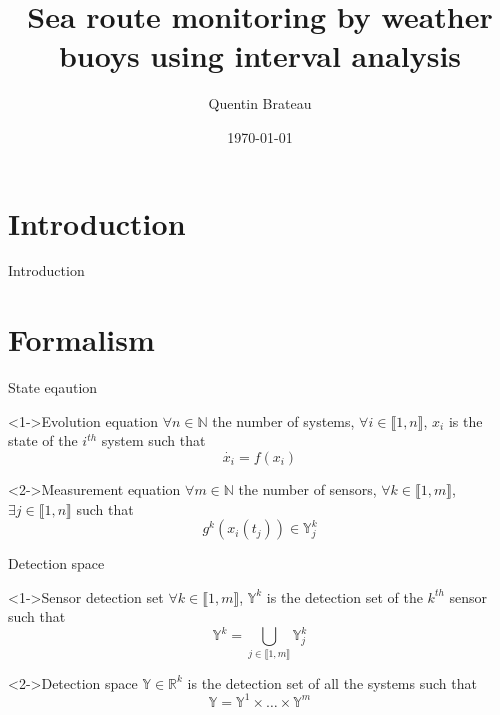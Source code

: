\documentclass{beamer}
\title{Sea route monitoring by weather buoys using interval analysis}
\date{\today}
\author{Quentin Brateau}
\institute{ENSTA Bretagne}
\begin{document}
    \maketitle

    \section{Introduction}

        \begin{frame}{Introduction}
        \end{frame}

    \section{Formalism}

        \begin{frame}{State eqaution}
            \begin{block}<1->{Evolution equation}
                $\forall n \in \mathbb{N}$ the number of systems, $\forall i \in \llbracket 1, n\rrbracket$, $x_i$ is the state of the $i^{th}$ system such that
                \begin{equation}
                    \dot{x_i} = f(x_i)
                \end{equation}
            \end{block}

            \begin{block}<2->{Measurement equation}
                $\forall m \in \mathbb{N}$ the number of sensors, $\forall k \in \llbracket 1, m\rrbracket$, $\exists j \in \llbracket 1, n\rrbracket$ such that
                \begin{equation}
                    g^k(x_i(t_j)) \in \mathbb{Y}_j^k
                \end{equation}
            \end{block}
        \end{frame}

        \begin{frame}{Detection space}
            \begin{block}<1->{Sensor detection set}
                $\forall k \in \llbracket 1, m\rrbracket$, $\mathbb{Y}^k$ is the detection set of the $k^{th}$ sensor such that
                \begin{equation}
                    \mathbb{Y}^k = \bigcup_{j \in \llbracket 1, m\rrbracket} \mathbb{Y}_j^k
                \end{equation}
            \end{block}
            \begin{block}<2->{Detection space}
                $\mathbb{Y} \in \mathbb{R}^k$ is the detection set of all the systems such that
                \begin{equation}
                    \mathbb{Y} = \mathbb{Y}^1 \times \dots \times \mathbb{Y}^m
                \end{equation}
            \end{block}
        \end{frame}
\end{document}
